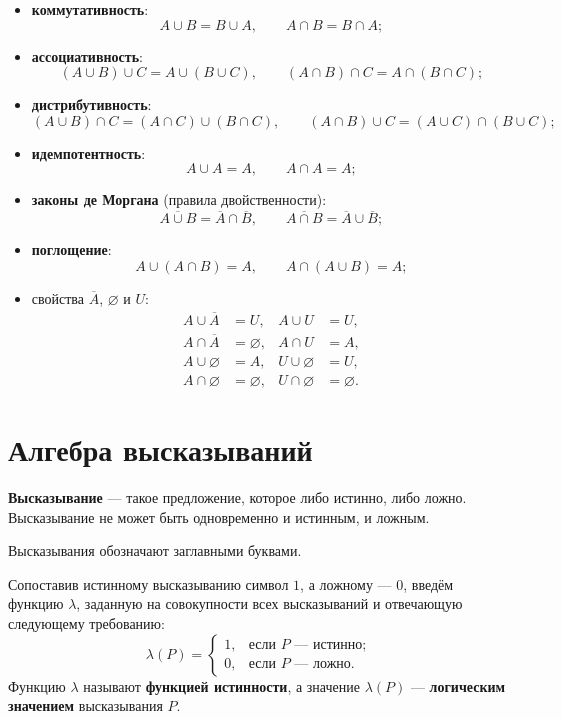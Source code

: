 \documentclass[a4paper, 12pt]{article}
\begin{document}
\begin{itemize}[noitemsep]
  \item \textbf{коммутативность}:
    \[ A \cup B = B \cup A, \qquad A \cap B = B \cap A; \]
  \item \textbf{ассоциативность}:
    \[ (A \cup B) \cup C = A \cup (B \cup C), \qquad
       (A \cap B) \cap C = A \cap (B \cap C); \]
  \item \textbf{дистрибутивность}:
    \[ (A \cup B) \cap C = (A \cap C) \cup (B \cap C), \qquad
       (A \cap B) \cup C = (A \cup C) \cap (B \cup C); \]
  \item \textbf{идемпотентность}:
    \[ A \cup A = A, \qquad A \cap A = A; \]
  \item \textbf{законы де Моргана} (правила двойственности):
    \[ \overline{A \cup B} = \overline{A} \cap \overline{B}, \qquad
       \overline{A \cap B} = \overline{A} \cup \overline{B}; \]
  \item \textbf{поглощение}:
    \[ A \cup (A \cap B) = A, \qquad A \cap (A \cup B) = A; \]
  \item свойства $\overline{A}$, $\varnothing$ и $U$: %
    \[
      \begin{aligned}
        A \cup \overline{A} &= U, & A \cup U &= U, \\
        A \cap \overline{A} &= \varnothing, & A \cap U &= A, \\
        A \cup \varnothing &= A, & U \cup \varnothing &= U, \\
        A \cap \varnothing &= \varnothing, & U \cap \varnothing &= \varnothing.
      \end{aligned}
    \]
\end{itemize}

\section*{Алгебра высказываний}

\textbf{Высказывание} --- такое предложение, которое либо истинно, либо ложно.
Высказывание не может быть одновременно и истинным, и ложным.

Высказывания обозначают заглавными буквами.

Сопоставив истинному высказыванию символ $1$, а ложному --- $0$, введём
функцию $\lambda$, заданную на совокупности всех высказываний и отвечающую
следующему требованию:
\[
  \lambda(P) =
  \begin{cases}
    1, & \text{если } P \text{ --- истинно};\\
    0, & \text{если } P \text{ --- ложно}.
  \end{cases}
\]
Функцию $\lambda$ называют \textbf{функцией истинности}, а значение
$\lambda(P)$ --- \textbf{логическим значением} высказывания $P$.
\end{document}
